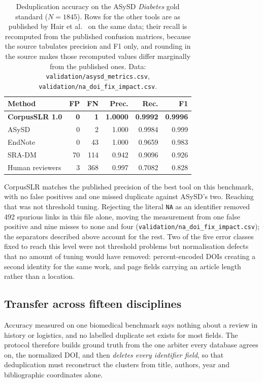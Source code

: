\documentclass[final,5p,times,twocolumn]{elsarticle}
\begin{document}
\begin{table}[t]
\caption{Deduplication accuracy on the ASySD \emph{Diabetes} gold standard
($N = 1845$). Rows for the other tools are as published by Hair et
al.~\cite{hair2023} on the same data; their recall is recomputed from the
published confusion matrices, because the source tabulates precision and F1
only, and rounding in the source makes those recomputed values differ
marginally from the published ones. Data:
\texttt{validation/asysd\_metrics.csv},
\texttt{validation/na\_doi\_fix\_impact.csv}.}
\label{tab:gold}
\small
\begin{tabular}{@{}lrrrrr@{}}
\toprule
\textbf{Method} & \textbf{FP} & \textbf{FN} & \textbf{Prec.} &
\textbf{Rec.} & \textbf{F1} \\
\midrule
\textbf{CorpusSLR 1.0} & \textbf{0} & \textbf{1} & \textbf{1.0000} &
\textbf{0.9992} & \textbf{0.9996} \\
ASySD & 0 & 2 & 1.000 & 0.9984 & 0.999 \\
EndNote & 0 & 43 & 1.000 & 0.9659 & 0.983 \\
SRA-DM & 70 & 114 & 0.942 & 0.9096 & 0.926 \\
Human reviewers & 3 & 368 & 0.997 & 0.7082 & 0.828 \\
\bottomrule
\end{tabular}
\end{table}

CorpusSLR matches the published precision of the best tool on this benchmark,
with no false positives and one missed duplicate against ASySD's two. Reaching
that was not threshold tuning. Rejecting the literal \texttt{NA} as an
identifier removed 492 spurious links in this file alone, moving the
measurement from one false positive and nine misses to none and four
(\texttt{validation/na\_doi\_fix\_impact.csv}); the separators described above
account for the rest. Two of the five error classes fixed to reach this level
were not threshold problems but normalisation defects that no amount of tuning
would have removed: percent-encoded DOIs creating a second identity for the
same work, and page fields carrying an article length rather than a location.

\subsection{Transfer across fifteen disciplines}

Accuracy measured on one biomedical benchmark says nothing about a review in
history or logistics, and no labelled duplicate set exists for most fields.
The protocol therefore builds ground truth from the one arbiter every database
agrees on, the normalized DOI, and then \emph{deletes every identifier field},
so that deduplication must reconstruct the clusters from title, authors, year
and bibliographic coordinates alone.
\end{document}
